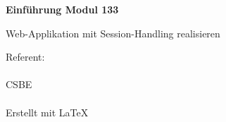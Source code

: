 
\thispagestyle{empty}
\begin{titlepage}
    \begin{center}
        \vspace*{2.5cm}

        \Huge
        \textbf{Einführung Modul 133}

        \vspace{0.5cm}
        \LARGE


        \vfill

        Web-Applikation mit Session-Handling realisieren\\

        \vspace{0.8cm}

        \Large
        Referent: \gitAuthorName\\
        \gitAuthorEmail\\
        CSBE\\
        \gitAuthorDate\\
        \small
        \vspace{1cm}
        Erstellt mit \LaTeX\\
        \vspace{1cm}
        \gitStyler
    \end{center}
\end{titlepage}